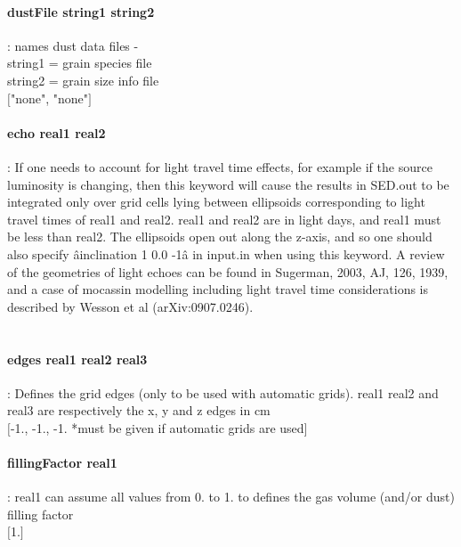 \documentclass[11pt]{article}
\begin{document}
\paragraph    {dustFile string1 string2} : names dust data files - \\
                     string1 = grain species file\\
                     string2 = grain size info file\\
		     $[$"none", "none"$]$\\

\paragraph    {echo real1 real2} : If one needs to account for light
                     travel time effects, for example if the source
                     luminosity is changing, then this keyword will
                     cause the results in SED.out to be integrated
                     only over grid cells lying between ellipsoids
                     corresponding to light travel times of real1 and
                     real2. real1 and real2 are in light days, and
                     real1 must be less than real2. The   ellipsoids
                     open out along the z-axis, and so one should also
                     specify âinclination 1 0.0 -1â in input.in when
                     using this keyword. A review of the geometries of
                     light echoes can be found in Sugerman, 2003, AJ,
                     126, 1939, and a case of mocassin modelling
                     including light travel time considerations is
                     described by Wesson et al (arXiv:0907.0246).\\  
                     [.false.]\\

\paragraph    {edges real1 real2 real3 }: Defines the grid edges (only to be used with automatic
                     grids). real1 real2 and real3 are respectively the x, y and z 
                     edges in cm\\
                     $[$-1., -1., -1. *must be given if automatic grids are used$]$\\
		    

\paragraph    {fillingFactor real1} : real1 can assume all values from 0. to 1. to defines the gas 
                     volume (and/or dust) filling factor\\
                     $[$1.$]$\\
\end{document}
